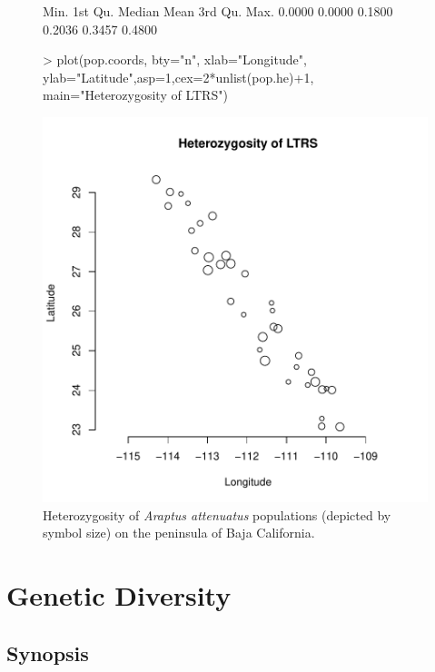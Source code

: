 \documentclass[letterpaper,twoside,openany]{book}
\begin{document}
\begin{figure}[bth]
	\centering
\begin{Schunk}
\begin{Soutput}
   Min. 1st Qu.  Median    Mean 3rd Qu.    Max. 
 0.0000  0.0000  0.1800  0.2036  0.3457  0.4800 
\end{Soutput}
\begin{Sinput}
> plot(pop.coords, bty="n", xlab="Longitude", ylab="Latitude",asp=1,cex=2*unlist(pop.he)+1, main="Heterozygosity of LTRS")
\end{Sinput}
\end{Schunk}
\includegraphics{gstudio-021}
	\caption{Heterozygosity of \emph{Araptus attenuatus} populations (depicted by symbol size) on the peninsula of Baja California.}
	\label{fig:araptus_he}
\end{figure}
\chapter{Genetic Diversity}

\section{Synopsis}
\end{document}
